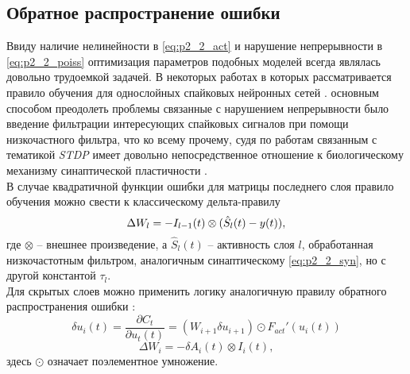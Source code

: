 \subsection{Обратное распространение ошибки}
\indent Ввиду наличие нелинейности в \eqref{eq:p2_2_act} и нарушение непрерывности в \eqref{eq:p2_2_poiss} оптимизация параметров подобных моделей всегда являлась довольно трудоемкой задачей. В некоторых работах в которых рассматривается правило обучения для однослойных спайковых нейронных сетей \cite{mohemmed2012span, florian2008tempotron, ponulak2005resume}. основным способом преодолеть проблемы связанные с нарушением непрерывности было введение фильтрации интересующих спайковых сигналов при помощи низкочастного фильтра, что ко всему прочему, судя по работам связанным с тематикой  \textit{STDP} имеет довольно непосредственное отношение к биологическому механизму синаптической пластичности \cite{dan2004spike}.\\
\indent В случае квадратичной функции ошибки для матрицы последнего слоя правило обучения можно свести к классическому дельта-правилу \cite{jain1998fusion}
\begin{equation}
\Delta W_{l} = - \space I_{l-1}(t) \otimes (\hat S_{l}(t) - y(t)),
\end{equation}
где $\otimes$ -- внешнее произведение, а $\hat S_{l}(t)$ -- активность слоя $l$, обработанная низкочастотным фильтром, аналогичным синаптическому \eqref{eq:p2_2_syn}, но с другой константой $\tau_{l}$.\\
\indent Для скрытых слоев можно применить логику аналогичную правилу обратного распространения ошибки \cite{wossermanNeuroComp}:
\begin{equation} \label{eq:p2_3_bp}
\delta u_{i}(t) = \frac{\partial C_{t}}{\partial u_{t}(t)} = (W_{i+1} \delta u_{i+1}) \odot F_{act}'(u_{i}(t))
\end{equation}
\begin{equation}
\Delta W_{i} = - \delta A_{i}(t) \otimes I_{i}(t),
\end{equation}
здесь $\odot$ означает поэлементное умножение.
